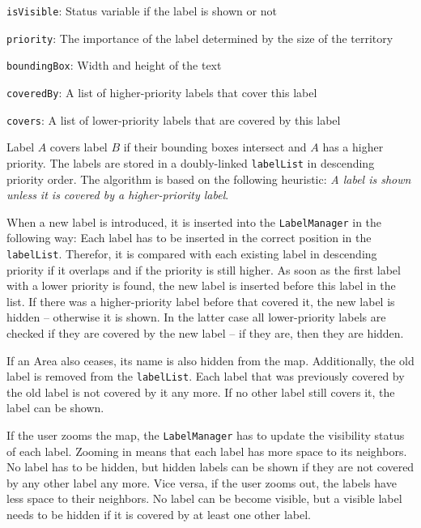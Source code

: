 \begin{compactitem}
  \item \texttt{isVisible}: Status variable if the label is shown or not
  \item \texttt{priority}: The importance of the label determined by the size of the territory
  \item \texttt{boundingBox}: Width and height of the text
  \item \texttt{coveredBy}: A list of higher-priority labels that cover this label
  \item \texttt{covers}: A list of lower-priority labels that are covered by this label
\end{compactitem}

Label $A$ covers label $B$ if their bounding boxes intersect and $A$ has a higher priority. The labels are stored in a doubly-linked \texttt{labelList} in descending priority order. The algorithm is based on the following heuristic: \emph{A label is shown unless it is covered by a higher-priority label}.

When a new label is introduced, it is inserted into the \texttt{LabelManager} in the following way:
Each label has to be inserted in the correct position in the \texttt{labelList}. Therefor, it is compared with each existing label in descending priority if it overlaps and if the priority is still higher.
As soon as the first label with a lower priority is found, the new label is inserted before this label in the list. If there was a higher-priority label before that covered it, the new label is hidden -- otherwise it is shown. In the latter case all lower-priority labels are checked if they are covered by the new label -- if they are, then they are hidden.

If an Area also ceases, its name is also hidden from the map. Additionally, the old label is removed from the \texttt{labelList}. Each label that was previously covered by the old label is not covered by it any more. If no other label still covers it, the label can be shown.

If the user zooms the map, the \texttt{LabelManager} has to update the visibility status of each label. Zooming in  means that each label has more space to its neighbors. No label has to be hidden, but hidden labels can be shown if they are not covered by any other label any more. Vice versa, if the user zooms out, the labels have less space to their neighbors. No label can be become visible, but a visible label needs to be hidden if it is covered by at least one other label.

